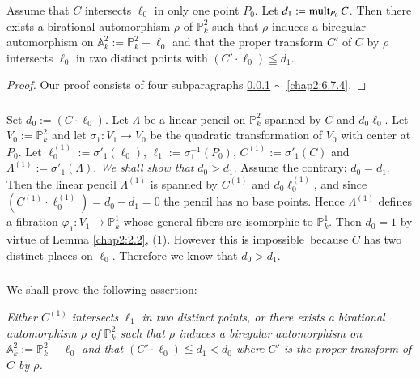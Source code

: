 \begin{lemma*}
Assume that $C$ intersects $\ell_{0}$ in only one point $P_{0}$. Let
$d_{1}:=\operatorname{mult}_{P_{0}}C$. Then there exists a birational automorphism
$\rho$ of $\mathbb{P}^{2}_{k}$ such that $\rho$ induces a biregular
automorphism on $\mathbb{A}^{2}_{k}:=\mathbb{P}^{2}_{k}-\ell_{0}$ and
that the proper transform $C'$ of $C$ by $\rho$ intersects $\ell_{0}$
in two distinct points with $(C'\cdot\ell_{0})\leqq d_{1}$.
\end{lemma*}

\begin{proof}
Our proof consists of four subparagraphs \ref{chap2:6.7.1} $\sim$ \ref{chap2:6.7.4}.
\end{proof}

\subsubsection{}\label{chap2:6.7.1}
Set $d_{0}:=(C\cdot\ell_{0})$. Let $\Lambda$ be a linear pencil on
$\mathbb{P}^{2}_{k}$ spanned by $C$ and $d_{0}\ell_{0}$. Let
$V_{0}:=\mathbb{P}^{2}_{k}$ and let $\sigma_{1}:V_{1}\to V_{0}$ be the
quadratic transformation of $V_{0}$ with center at $P_{0}$. Let
$\ell^{(1)}_{0}:=\sigma'_{1}(\ell_{0})$,
$\ell_{1}:=\sigma^{-1}_{1}(P_{0})$, $C^{(1)}:=\sigma'_{1}(C)$ and
$\Lambda^{(1)}:=\sigma'_{1}(\Lambda)$. {\em We shall show that}
$d_{0}>d_{1}$. Assume the contrary: $d_{0}=d_{1}$. Then the linear
pencil $\Lambda^{(1)}$ is spanned by $C^{(1)}$ and
$d_{0}\ell_{0}^{(1)}$, and since
$(C^{(1)}\cdot\ell_{0}^{(1)})=d_{0}-d_{1}=0$ the pencil has no base
points. Hence $\Lambda^{(1)}$ defines a fibration
$\varphi_{1}:V_{1}\to \mathbb{P}^{1}_{k}$ whose general fibers are
isomorphic to $\mathbb{P}^{1}_{k}$. Then $d_{0}=1$ by virtue of Lemma
\ref{chap2:2.2}, (1). However this is impossible\pageoriginale\ because
$C$ has two distinct places on $\ell_{0}$. Therefore we know that
$d_{0}>d_{1}$. 

\subsubsection{}\label{chap2:6.7.2}
We shall prove the following assertion:

{\em Either $C^{(1)}$ intersects $\ell_{1}$ in two distinct points, or
  there exists a birational automorphism $\rho$ of
  $\mathbb{P}^{2}_{k}$ such that $\rho$ induces a biregular
  automorphism on $\mathbb{A}^{2}_{k}:=\mathbb{P}^{2}_{k}-\ell_{0}$
  and that $(C'\cdot\ell_{0})\leqq d_{1}<d_{0}$ where $C'$ is the
  proper transform of $C$ by $\rho$.}

